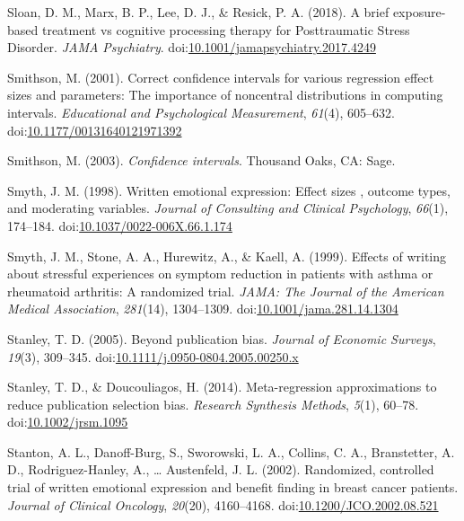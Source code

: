 \documentclass[man]{apa6}
\theoremstyle{definition}
\theoremstyle{definition}
\theoremstyle{definition}
\theoremstyle{remark}
\begin{document}
\hypertarget{ref-Sloan2018}{}
Sloan, D. M., Marx, B. P., Lee, D. J., \& Resick, P. A. (2018). A brief
exposure-based treatment vs cognitive processing therapy for
Posttraumatic Stress Disorder. \emph{JAMA Psychiatry}.
doi:\href{https://doi.org/10.1001/jamapsychiatry.2017.4249}{10.1001/jamapsychiatry.2017.4249}

\hypertarget{ref-Smithson2001}{}
Smithson, M. (2001). Correct confidence intervals for various regression
effect sizes and parameters: The importance of noncentral distributions
in computing intervals. \emph{Educational and Psychological
Measurement}, \emph{61}(4), 605--632.
doi:\href{https://doi.org/10.1177/00131640121971392}{10.1177/00131640121971392}

\hypertarget{ref-Smithson2003}{}
Smithson, M. (2003). \emph{Confidence intervals}. Thousand Oaks, CA:
Sage.

\hypertarget{ref-Smyth1998}{}
Smyth, J. M. (1998). Written emotional expression: Effect sizes ,
outcome types, and moderating variables. \emph{Journal of Consulting and
Clinical Psychology}, \emph{66}(1), 174--184.
doi:\href{https://doi.org/10.1037/0022-006X.66.1.174}{10.1037/0022-006X.66.1.174}

\hypertarget{ref-Smyth1999}{}
Smyth, J. M., Stone, A. A., Hurewitz, A., \& Kaell, A. (1999). Effects
of writing about stressful experiences on symptom reduction in patients
with asthma or rheumatoid arthritis: A randomized trial. \emph{JAMA: The
Journal of the American Medical Association}, \emph{281}(14),
1304--1309.
doi:\href{https://doi.org/10.1001/jama.281.14.1304}{10.1001/jama.281.14.1304}

\hypertarget{ref-Stanley2005}{}
Stanley, T. D. (2005). Beyond publication bias. \emph{Journal of
Economic Surveys}, \emph{19}(3), 309--345.
doi:\href{https://doi.org/10.1111/j.0950-0804.2005.00250.x}{10.1111/j.0950-0804.2005.00250.x}

\hypertarget{ref-Stanley2014}{}
Stanley, T. D., \& Doucouliagos, H. (2014). Meta-regression
approximations to reduce publication selection bias. \emph{Research
Synthesis Methods}, \emph{5}(1), 60--78.
doi:\href{https://doi.org/10.1002/jrsm.1095}{10.1002/jrsm.1095}

\hypertarget{ref-Stanton2002}{}
Stanton, A. L., Danoff-Burg, S., Sworowski, L. A., Collins, C. A.,
Branstetter, A. D., Rodriguez-Hanley, A., \ldots{} Austenfeld, J. L.
(2002). Randomized, controlled trial of written emotional expression and
benefit finding in breast cancer patients. \emph{Journal of Clinical
Oncology}, \emph{20}(20), 4160--4168.
doi:\href{https://doi.org/10.1200/JCO.2002.08.521}{10.1200/JCO.2002.08.521}
\end{document}
